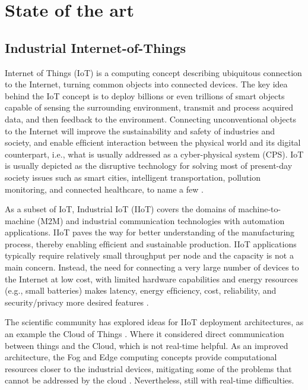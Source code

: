 \section{State of the art}
\subsection{Industrial Internet-of-Things}
Internet of Things (IoT) is a computing concept describing ubiquitous connection to the Internet, turning common objects into connected devices. The key idea behind the IoT concept is to deploy billions or even trillions of smart objects capable of sensing the surrounding environment, transmit and process acquired data, and then feedback to the environment. Connecting unconventional objects to the Internet will improve the sustainability and safety of industries and society, and enable efﬁcient interaction between the physical world and its digital counterpart, i.e., what is usually addressed as a cyber-physical system (CPS). IoT is usually depicted as the disruptive technology for solving most of present-day society issues such as smart cities, intelligent transportation, pollution monitoring, and connected healthcare, to name a few \cite{sisinni2018industrial}.

As a subset of IoT, Industrial IoT (IIoT) covers the domains of machine-to-machine (M2M) and industrial communication technologies with automation applications. IIoT paves the way for better understanding of the manufacturing process, thereby enabling efﬁcient and sustainable production. IIoT applications typically require relatively small throughput per node and the capacity is not a main concern. Instead, the need for connecting a very large number of devices to the Internet at low cost, with limited hardware capabilities and energy resources (e.g., small batteries) makes latency, energy efﬁciency, cost, reliability, and security/privacy more desired features \cite{aakerberg2011future}.

The scientific community has explored ideas for IIoT deployment architectures, as an example the Cloud of Things \cite{lin2015industrial,aazam2014cloud}. Where it considered direct communication between things and the Cloud, which is not real-time helpful. As an improved architecture, the Fog and Edge computing concepts provide computational resources closer to the industrial devices, mitigating some of the problems that cannot be addressed by the cloud \cite{bonomi2012fog,cisco2015fog}. Nevertheless, still with real-time difficulties.


